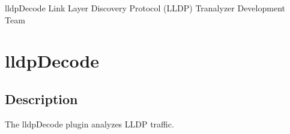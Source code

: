 \documentclass[documentation]{subfiles}
\begin{document}
\trantitle
    {lldpDecode} %
    {Link Layer Discovery Protocol (LLDP)} %
    {Tranalyzer Development Team} %

\section{lldpDecode}\label{s:lldpDecode}

\subsection{Description}
The lldpDecode plugin analyzes LLDP traffic.




%
%
\end{document}
